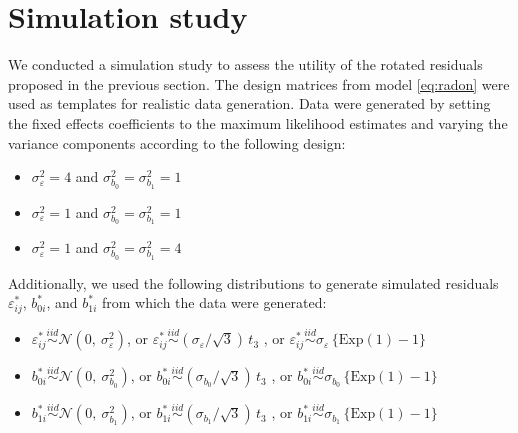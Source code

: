 \documentclass[12pt]{article} %
\begin{document}
\section{Simulation study}\label{sec:simulation}


We conducted a simulation study to assess the utility of the rotated residuals proposed in the previous section. The design matrices from model \eqref{eq:radon} were used as templates for realistic data generation.
Data were generated by setting the fixed effects coefficients to the maximum likelihood estimates and varying the variance components according to the following design:
%
\begin{itemize}
\item $\sigma^2_\varepsilon = 4$ and  $\sigma^2_{b_0} = \sigma^2_{b_1} = 1$
\item $\sigma^2_\varepsilon = 1$ and  $\sigma^2_{b_0} = \sigma^2_{b_1} = 1$
\item $\sigma^2_\varepsilon = 1$ and  $\sigma^2_{b_0} = \sigma^2_{b_1} = 4$

\end{itemize}
%
Additionally, we used the following distributions to generate simulated residuals $\varepsilon_{ij}^*$, $b_{0i}^*$, and $b_{1i}^*$ from which the data were generated:
%
\begin{itemize}
\item $\varepsilon_{ij}^* \overset{iid}{\sim} \mathcal{N}(0, \ \sigma^2_{\varepsilon})$, or $\varepsilon_{ij}^* \overset{iid}{\sim} (\sigma_{\varepsilon} / \sqrt{3})\, t_3$ , or $\varepsilon_{ij}^* \overset{iid}{\sim} \sigma_{\varepsilon} \, \{ \text{Exp}(1) - 1 \}$

\item $b_{0i}^* \overset{iid}{\sim} \mathcal{N}(0, \ \sigma^2_{b_{0}})$, or $b_{0i}^* \overset{iid}{\sim} (\sigma_{b_{0}} / \sqrt{3})\, t_3$ , or $b_{0i}^* \overset{iid}{\sim} \sigma_{b_{0}} \, \{ \text{Exp}(1) - 1 \}$

\item $b_{1i}^* \overset{iid}{\sim} \mathcal{N}(0, \ \sigma^2_{b_{1}})$, or $b_{1i}^* \overset{iid}{\sim} (\sigma_{b_{1}} / \sqrt{3})\, t_3$ , or $b_{1i}^* \overset{iid}{\sim} \sigma_{b_{1}} \, \{ \text{Exp}(1) - 1 \}$
\end{itemize}
\end{document}
